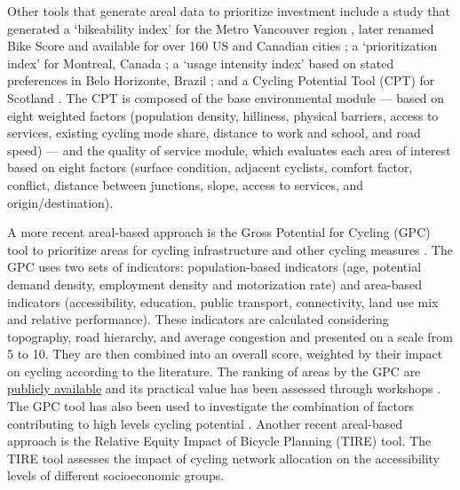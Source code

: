 \documentclass[
  super,
  preprint,
  3p]{elsarticle}
\begin{document}
Other tools that generate areal data to prioritize investment include a
study that generated a {`bikeability index' for the Metro Vancouver
region \citep{winters_mapping_2013}, later renamed Bike Score and
available for over 160 US and Canadian cities \citep{winters_bike_2016};
a} `prioritization index' for Montreal, Canada
\citep{larsen_build_2013}; a `usage intensity index' based on stated
preferences in Belo Horizonte, Brazil \citep{zhang_prioritizing_2014};
and a Cycling Potential Tool (CPT) for Scotland
\citep{phillips_development_2017}. The CPT is composed of the base
environmental module --- based on eight weighted factors (population
density, hilliness, physical barriers, access to services, existing
cycling mode share, distance to work and school, and road speed) --- and
the quality of service module, which evaluates each area of interest
based on eight factors (surface condition, adjacent cyclists, comfort
factor, conflict, distance between junctions, slope, access to services,
and origin/destination).

A more recent areal-based approach is the Gross Potential for Cycling
(GPC) tool to prioritize areas for cycling infrastructure and other
cycling measures \citep{silva_gross_2021}. The GPC uses two sets of
indicators: population-based indicators (age, potential demand density,
employment density and motorization rate) and area-based indicators
(accessibility, education, public transport, connectivity, land use mix
and relative performance). These indicators are calculated considering
topography, road hierarchy, and average congestion and presented on a
scale from 5 to 10. They are then combined into an overall score,
weighted by their impact on cycling according to the literature. The
ranking of areas by the GPC are
\href{https://boost.up.pt/en/ferramentas/gpc}{publicly available} and
its practical value has been assessed through workshops
\citep{silva_revealing_2022}. {The GPC tool has also been used to
investigate the combination of factors contributing to high levels
cycling potential \citep{lopes_impact_2021}. Another recent areal-based
approach is the Relative Equity Impact of Bicycle Planning (TIRE)
\citep{cunha_assessing_2023} tool. The TIRE tool assesses the impact of
cycling network allocation on the accessibility levels of different
socioeconomic groups.}
\end{document}
